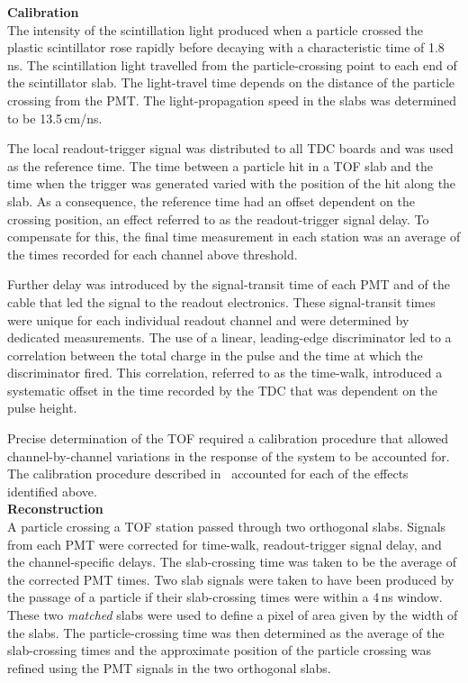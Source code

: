 \noindent\textbf{Calibration} \\
\noindent
The intensity of the scintillation light produced when a particle
crossed the plastic scintillator rose rapidly before decaying
with a characteristic time of 1.8\,ns. 
The scintillation light travelled from the particle-crossing point to
each end of the scintillator slab.
The light-travel time depends on the distance of the particle
crossing from the PMT.
The light-propagation speed in the slabs was determined to be 13.5\,cm/ns.

The local readout-trigger signal was distributed to all TDC boards and was
used as the reference time.
The time between a particle hit in a TOF slab and the time when the
trigger was generated varied with the position of the hit along the slab.
As a consequence, the reference time had an offset dependent on
the crossing position, an effect referred to as the
readout-trigger signal delay.
To compensate for this, the final time measurement in each station was
an average of the times recorded for each channel above
threshold.

Further delay was introduced by the signal-transit time of each PMT
and of the cable that led the signal to the readout electronics.
These signal-transit times were unique for each individual readout
channel and were determined by dedicated measurements.
The use of a linear, leading-edge discriminator led to a correlation
between the total charge in the pulse and the time at which the
discriminator fired.
This correlation, referred to as the time-walk, introduced a
systematic offset in the time recorded by the TDC that was dependent on the pulse
height. 

Precise determination of the TOF required a calibration procedure that
allowed channel-by-channel variations in the response of the system to
be accounted for.
The calibration procedure described in~\cite{NOTE251} accounted for
each of the effects identified above. \\

\noindent\textbf{Reconstruction} \\
\noindent
A particle crossing a TOF station passed through two orthogonal
slabs.
Signals from each PMT were corrected for time-walk, readout-trigger
signal delay, and the channel-specific delays.
The slab-crossing time was taken to be the average of the corrected
PMT times.
Two slab signals were taken to have been produced by the passage of a
particle if their slab-crossing times were within a 4\,ns window.
These two \textit{matched} slabs were used to define a pixel of area given by the
width of the slabs.
The particle-crossing time was then determined as the average of the
slab-crossing times and the approximate position of the particle crossing was
refined using the PMT signals in the two orthogonal slabs. \\

